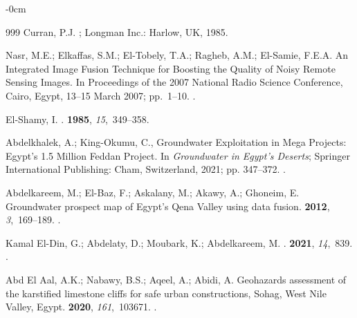 \documentclass[information,article,accept,pdftex,moreauthors]{Definitions/mdpi}
\begin{document}
\begin{adjustwidth}{-\extralength}{0cm}
\begin{thebibliography}{999}
Curran, P.J.
; Longman Inc.: Harlow, UK,  %
 1985.

Nasr, M.E.; Elkaffas, S.M.; El-Tobely, T.A.; Ragheb, A.M.; El-Samie, F.E.A.
\newblock An Integrated Image Fusion Technique for Boosting the Quality of
  Noisy Remote Sensing Images.
\newblock In Proceedings of the 2007 National Radio Science Conference, Cairo, Egypt, 13--15 March 2007; %
  \mbox{pp. 1--10.}
.

{El-Shamy}, I.
.
 {\bf 1985}, {\em
  15},~349--358.

Abdelkhalek, A.; King-Okumu, C., Groundwater Exploitation in Mega Projects:
  Egypt's 1.5 Million Feddan Project.
\newblock In {\em Groundwater in Egypt's Deserts}; Springer International
  Publishing: Cham, Switzerland, 2021; pp. 347--372.
.

Abdelkareem, M.; El-Baz, F.; Askalany, M.; Akawy, A.; Ghoneim, E.
\newblock Groundwater prospect map of Egypt's Qena Valley using data fusion.
 {\bf 2012}, {\em
  3},~169--189.
.

Kamal El-Din, G.; Abdelaty, D.; Moubark, K.; Abdelkareem, M.
.
 {\bf 2021}, {\em 14},~839.
.

{Abd El Aal}, A.K.; Nabawy, B.S.; Aqeel, A.; Abidi, A.
\newblock Geohazards assessment of the karstified limestone cliffs for safe
  urban constructions, Sohag, West Nile Valley, Egypt.
 {\bf 2020}, {\em
  161},~103671.
.


\end{thebibliography}
\end{adjustwidth}
\end{document}

